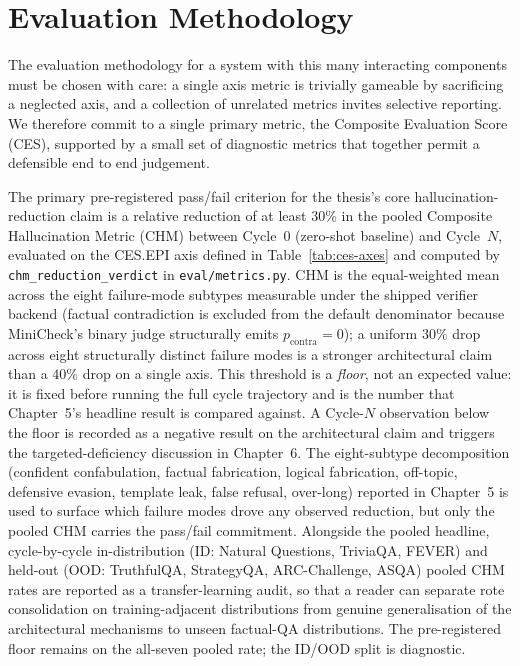 \section{Evaluation Methodology}
\label{sec:evaluation}

The evaluation methodology for a system with this many interacting components must be chosen with care: a single axis metric is trivially gameable by sacrificing a neglected axis, and a collection of unrelated metrics invites selective reporting. We therefore commit to a single primary metric, the Composite Evaluation Score (CES), supported by a small set of diagnostic metrics that together permit a defensible end to end judgement.

The primary pre-registered pass/fail criterion for the thesis's core hallucination-reduction claim is a relative reduction of at least $30\%$ in the pooled Composite Hallucination Metric (CHM) between Cycle~$0$ (zero-shot baseline) and Cycle~$N$, evaluated on the CES.EPI axis defined in Table~\ref{tab:ces-axes} and computed by \texttt{chm\_reduction\_verdict} in \texttt{eval/metrics.py}. CHM is the equal-weighted mean across the eight failure-mode subtypes measurable under the shipped verifier backend (factual contradiction is excluded from the default denominator because MiniCheck's binary judge structurally emits $p_{\text{contra}} = 0$); a uniform $30\%$ drop across eight structurally distinct failure modes is a stronger architectural claim than a $40\%$ drop on a single axis. This threshold is a \emph{floor}, not an expected value: it is fixed before running the full cycle trajectory and is the number that Chapter~5's headline result is compared against. A Cycle-$N$ observation below the floor is recorded as a negative result on the architectural claim and triggers the targeted-deficiency discussion in Chapter~6. The eight-subtype decomposition (confident confabulation, factual fabrication, logical fabrication, off-topic, defensive evasion, template leak, false refusal, over-long) reported in Chapter~5 is used to surface which failure modes drove any observed reduction, but only the pooled CHM carries the pass/fail commitment. Alongside the pooled headline, cycle-by-cycle in-distribution (ID: Natural Questions, TriviaQA, FEVER) and held-out (OOD: TruthfulQA, StrategyQA, ARC-Challenge, ASQA) pooled CHM rates are reported as a transfer-learning audit, so that a reader can separate rote consolidation on training-adjacent distributions from genuine generalisation of the architectural mechanisms to unseen factual-QA distributions. The pre-registered floor remains on the all-seven pooled rate; the ID/OOD split is diagnostic.

